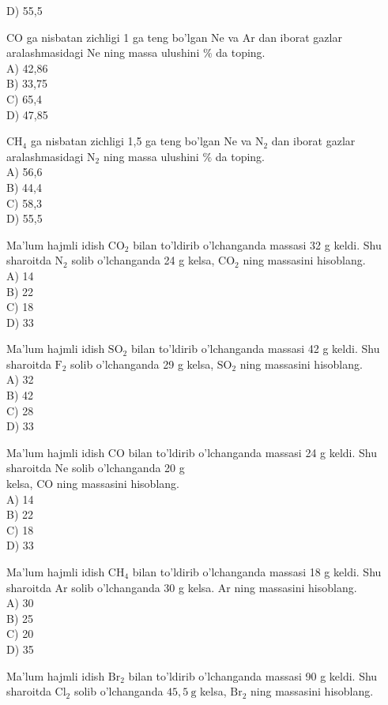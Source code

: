 D) 55,5
  \item CO ga nisbatan zichligi 1 ga teng bo'lgan Ne va Ar dan iborat gazlar aralashmasidagi Ne ning massa ulushini $\%$ da toping.\\
A) 42,86\\
B) 33,75\\
C) 65,4\\
D) 47,85
  \item $\mathrm{CH}_{4}$ ga nisbatan zichligi 1,5 ga teng bo'lgan Ne va $\mathrm{N}_{2}$ dan iborat gazlar aralashmasidagi $\mathrm{N}_{2}$ ning massa ulushini $\%$ da toping.\\
A) 56,6\\
B) 44,4\\
C) 58,3\\
D) 55,5
  \item Ma'lum hajmli idish $\mathrm{CO}_{2}$ bilan to'ldirib o'lchanganda massasi 32 g keldi. Shu sharoitda $\mathrm{N}_{2}$ solib o'lchanganda 24 g kelsa, $\mathrm{CO}_{2}$ ning massasini hisoblang.\\
A) 14\\
B) 22\\
C) 18\\
D) 33
  \item Ma'lum hajmli idish $\mathrm{SO}_{2}$ bilan to'ldirib o'lchanganda massasi 42 g keldi. Shu sharoitda $\mathrm{F}_{2}$ solib o'lchanganda 29 g kelsa, $\mathrm{SO}_{2}$ ning massasini hisoblang.\\
A) 32\\
B) 42\\
C) 28\\
D) 33
  \item Ma'lum hajmli idish CO bilan to'ldirib o'lchanganda massasi 24 g keldi. Shu sharoitda Ne solib o'lchanganda 20 g\\
kelsa, CO ning massasini hisoblang.\\
A) 14\\
B) 22\\
C) 18\\
D) 33
  \item Ma'lum hajmli idish $\mathrm{CH}_{4}$ bilan to'ldirib o'lchanganda massasi 18 g keldi. Shu sharoitda Ar solib o'lchanganda 30 g kelsa. Ar ning massasini hisoblang.\\
A) 30\\
B) 25\\
C) 20\\
D) 35
  \item Ma'lum hajmli idish $\mathrm{Br}_{2}$ bilan to'ldirib o'lchanganda massasi 90 g keldi. Shu sharoitda $\mathrm{Cl}_{2}$ solib o'lchanganda $45,5 \mathrm{~g}$ kelsa, $\mathrm{Br}_{2}$ ning massasini hisoblang.\\
